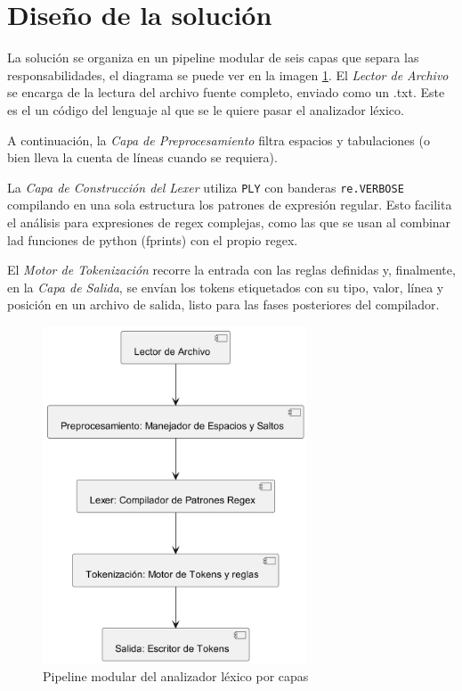 \documentclass{article}
\begin{document}
\section{Diseño de la solución}\label{sec:dis}


La solución se organiza en un pipeline modular de seis capas que separa 
las responsabilidades, el diagrama se puede ver en la imagen \ref{fig:pipelineLexico}.
El \emph{Lector de Archivo} se encarga de la lectura 
del archivo fuente completo, enviado como un .txt. Este es el
un código del lenguaje al que se le quiere pasar el analizador léxico.

A continuación, la \emph{Capa de Preprocesamiento} filtra espacios y tabulaciones 
(o bien lleva la cuenta de líneas cuando se requiera).

La \emph{Capa de Construcción del Lexer} utiliza \texttt{PLY} con banderas 
\texttt{re.VERBOSE} compilando en una sola estructura los patrones de expresión 
regular. Esto facilita el análisis para expresiones de regex
complejas, como las que se usan al combinar
lad funciones de python (fprints) con el propio regex.

El \emph{Motor de Tokenización} recorre la entrada con las reglas definidas y, 
finalmente, en la \emph{Capa de Salida}, se envían los tokens etiquetados 
con su tipo, valor, línea y posición en un archivo de salida, 
listo para las fases posteriores del compilador.

\begin{figure}[ht]
  \centering
  \includegraphics[width=0.7\textwidth]{Flujo.png}
  \caption{Pipeline modular del analizador léxico por capas}
  \label{fig:pipelineLexico}
\end{figure}
\end{document}
